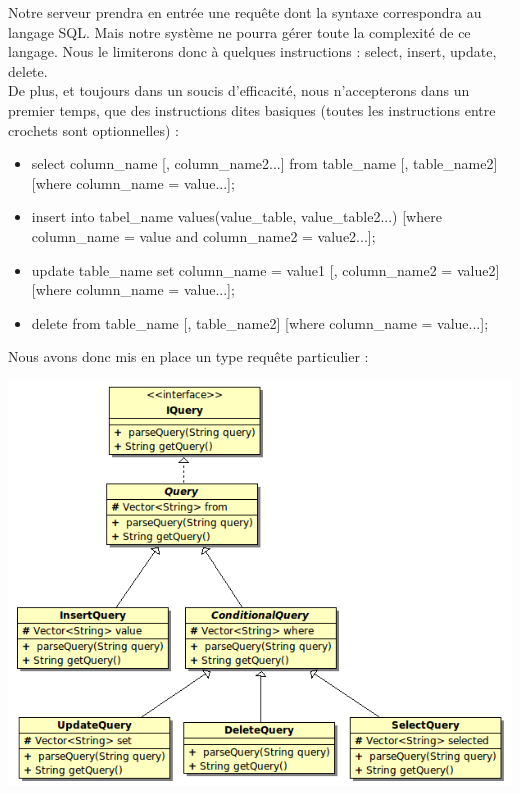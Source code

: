\documentclass[12pt]{article}
\begin{document}
	Notre serveur prendra en entrée une requête dont la syntaxe correspondra au langage SQL. Mais notre système ne pourra gérer toute la complexité de ce langage. Nous le limiterons donc à quelques instructions : select, insert, update, delete.\\
	De plus, et toujours dans un soucis d'efficacité, nous n'accepterons dans un premier temps, que des instructions dites basiques (toutes les instructions entre crochets sont optionnelles) :\\
	\begin{itemize}
	\item select column\_name [, column\_name2...] from table\_name [, table\_name2] [where column\_name = value...];\\
	\item insert into tabel\_name values(value\_table, value\_table2...) [where column\_name = value and column\_name2 = value2...];\\
	\item update table\_name set column\_name = value1 [, column\_name2  = value2] [where column\_name = value...];\\
	\item delete from table\_name [, table\_name2] [where column\_name = value...];\\
	\end{itemize}
	Nous avons donc mis en place un type requête particulier :\\

\begin{center}
	\includegraphics[scale=0.70]{images/QueryHierarchie.png}
\end{center}
\end{document}

